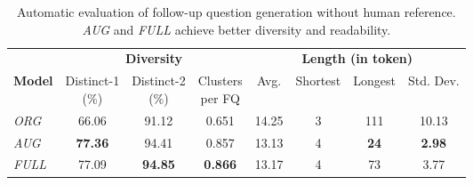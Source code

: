 \begin{table}[!t]
    \centering
    \scriptsize
    \setlength{\tabcolsep}{2pt}  %
    \begin{tabular}{lccccccc}
        \toprule
        & \multicolumn{3}{c}{\textbf{Diversity}} & \multicolumn{4}{c}{\textbf{Length (in token)}}\\ 
        \cmidrule(lr){2-4} \cmidrule(lr){5-8}
        \textbf{Model} & \shortstack{Distinct-1\\(\%)} & \shortstack{Distinct-2\\(\%)} & \shortstack{Clusters\\per FQ} & Avg. & Shortest & Longest & Std. Dev. \\
        \midrule
        \textit{ORG}  & 66.06 & 91.12 & 0.651 & 14.25 & 3  & 111 & 10.13  \\
        \textit{AUG} & \textbf{77.36} & 94.41 & 0.857 & 13.13 & 4  & \textbf{24}  & \textbf{2.98} \\
        \textit{FULL}  & 77.09 & \textbf{94.85} & \textbf{0.866} & 13.17 & 4  & 73  & 3.77  \\
        \bottomrule
    \end{tabular}
    \caption{Automatic evaluation of follow-up question generation without human reference. \textit{AUG} and \textit{FULL} achieve better diversity and readability.}
    \label{tab:auto_eval}
\end{table}